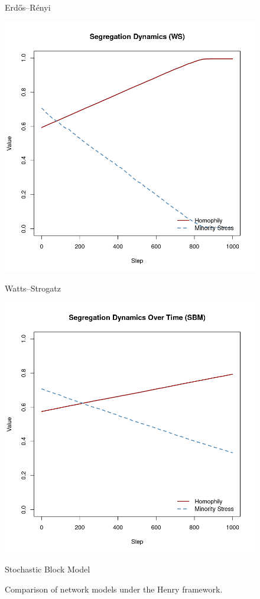 \begin{figure}[htbp]
\begin{minipage}[t]{0.24\linewidth}
        \caption{Erdős–Rényi}
        \label{fig:henryer}
    \end{minipage}
    \hfill
    \begin{minipage}[t]{0.24\linewidth}
        \centering
        \includegraphics[width=\linewidth]{images/henryws.png}
        \caption{Watts–Strogatz}
        \label{fig:henryws}
    \end{minipage}
    \hfill
    \begin{minipage}[t]{0.24\linewidth}
        \centering
        \includegraphics[width=\linewidth]{images/henry2.png}
        \caption{Stochastic Block Model}
        \label{fig:henrysbm}
    \end{minipage}
    \caption{Comparison of network models under the Henry framework.}
    \label{fig:henry_four}
\end{figure}
